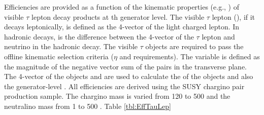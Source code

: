 Efficiencies are provided as a function of the kinematic properties (e.g., \pt) of visible $\tau$ lepton decay products at th generator level. The visible $\tau$ lepton (\visTau), if it decays leptonically, is defined as the 4-vector of the light charged lepton. In hadronic decays, \visTau is the difference between the 4-vector of the $\tau$ lepton and neutrino in the hadronic decay.%
The visible $\tau$ objects are required to pass the offline kinematic selection criteria ($\eta$ and \pt requirements). The \genMET variable is defined as the magnitude of the negative vector sum of the \visTau pairs in the transverse plane. The 4-vector of the \visTau objects and \genMET are used to calculate the \mt of the \visTau objects and  also the generator-level \mttwo.  %
All efficiencies are derived using the SUSY chargino pair production sample. 
The chargino mass is varied from 120 to 500 \GeV and the neutralino mass from 1 to 500 \GeV.
Table \ref{tbl:EffTauLep}
